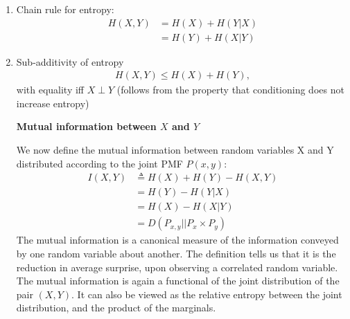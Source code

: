 \documentclass{article}
\begin{document}
\begin{enumerate}
\item Chain rule for entropy:
\begin{align}
H(X,Y) &= H(X) + H(Y|X) \\
&= H(Y) + H(X|Y)
\end{align}

\item Sub-additivity of entropy
\begin{align}
H(X, Y) \leq H(X) + H(Y),
\end{align}
with equality iff $X \perp Y$ (follows from the property that conditioning does not increase entropy)
\begin{definition}\textbf{Mutual information between $X$ and $Y$}\end{definition}
We now define the mutual information between random variables X and Y distributed according to the joint PMF $P(x,y)$:
\begin{align}
I(X,Y) &\triangleq H(X) + H(Y) - H(X,Y)\\
	&= H(Y) - H(Y|X)\\
	&= H(X) - H(X|Y)\\
	&= D(P_{x,y}||P_x \times P_y)
	\end{align}
The mutual information is a canonical measure of the information conveyed by one random variable about another. The definition tells us that it is the reduction in average surprise, upon observing a correlated random variable. The mutual information is again a functional of the joint distribution of the pair $(X,Y)$. It can also be viewed as the relative entropy between the joint distribution, and the product of the marginals. 

\end{enumerate}
\end{document}
